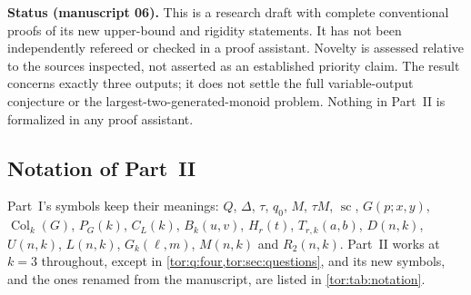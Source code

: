 \documentclass[11pt,a4paper]{article}
\numberwithin{equation}{section}
\theoremstyle{definition}
\theoremstyle{remark}
\newcommand{\D}{\Delta}
\newcommand{\statecomplex}{\operatorname{sc}}
\begin{document}
\begin{resultbox}
\textbf{Status (manuscript 06).} This is a research draft with complete
conventional proofs of its new upper-bound and rigidity statements. It has not
been independently refereed or checked in a proof assistant. Novelty is
assessed relative to the sources inspected, not asserted as an established
priority claim. The result concerns exactly three outputs; it does not settle
the full variable-output conjecture or the largest-two-generated-monoid
problem. Nothing in Part~II is formalized in any proof assistant.
\end{resultbox}

\subsection{Notation of Part~II}\label{tor:sec:notation}

Part~I's symbols keep their meanings: $Q$, $\D$, $\tau$, $q_0$, $M$,
$\tau M$, $\statecomplex$, $G(p;x,y)$, $\operatorname{Col}_k(G)$, $P_G(k)$,
$C_L(k)$, $B_k(u,v)$, $H_r(t)$, $T_{r,k}(a,b)$, $D(n,k)$, $U(n,k)$, $L(n,k)$,
$G_k(\ell,m)$, $M(n,k)$ and $R_2(n,k)$. Part~II works at $k=3$ throughout,
except in \cref{tor:q:four,tor:sec:questions}, and its new symbols, and the
ones renamed from the manuscript, are listed in \cref{tor:tab:notation}.
\end{document}
